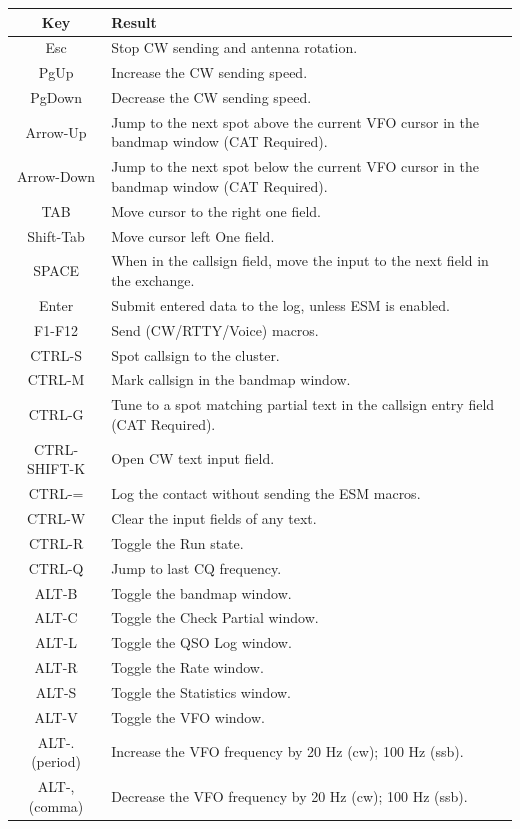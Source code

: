\documentclass{article}
\begin{document}
\begin{tabular}{| c | p{9cm} |}
    \hline
    \textbf{Key} & \textbf{Result} \\
    \hline
    Esc & Stop CW sending and antenna rotation.\\
    \hline
    PgUp & Increase the CW sending speed. \\
    \hline
    PgDown & Decrease the CW sending speed. \\
    \hline
    Arrow-Up & Jump to the next spot above the current VFO\index{VFO} cursor in the bandmap window (CAT\index{CAT} Required). \\
    \hline
    Arrow-Down & Jump to the next spot below the current VFO\index{VFO} cursor in the bandmap window (CAT\index{CAT} Required). \\
    \hline
    TAB & Move cursor to the right one field. \\
    \hline
    Shift-Tab & Move cursor left One field. \\
    \hline
    SPACE & When in the callsign field, move the input to the next field in the exchange. \\
    \hline
    Enter & Submit entered data to the log, unless ESM is enabled. \\
    \hline
    F1-F12 & Send (CW/RTTY/Voice) macros. \\
    \hline
    CTRL-S & Spot callsign to the cluster. \\
    \hline
    CTRL-M & Mark callsign in the bandmap window. \\
    \hline
    CTRL-G & Tune to a spot matching partial text in the callsign entry field (CAT\index{CAT} Required). \\
    \hline
    CTRL-SHIFT-K & Open CW text input field. \\
    \hline
    CTRL-= & Log the contact without sending the ESM macros. \\
    \hline
    CTRL-W & Clear the input fields of any text. \\
    \hline
    CTRL-R & Toggle the Run state. \\
    \hline
    CTRL-Q & Jump to last CQ frequency. \\
    \hline
    ALT-B	& Toggle the bandmap window. \\
    \hline
    ALT-C	& Toggle the Check Partial window. \\
    \hline
    ALT-L	& Toggle the QSO Log window. \\
    \hline
    ALT-R	& Toggle the Rate window. \\
    \hline
    ALT-S	& Toggle the Statistics window. \\
    \hline
    ALT-V	& Toggle the VFO\index{VFO} window. \\
    \hline
    ALT-.(period)	& Increase the VFO frequency by 20 Hz (cw); 100 Hz (ssb). \\
    \hline
    ALT-,(comma)	& Decrease the VFO frequency by 20 Hz (cw); 100 Hz (ssb). \\
    \hline
\end{tabular}
\end{document}
